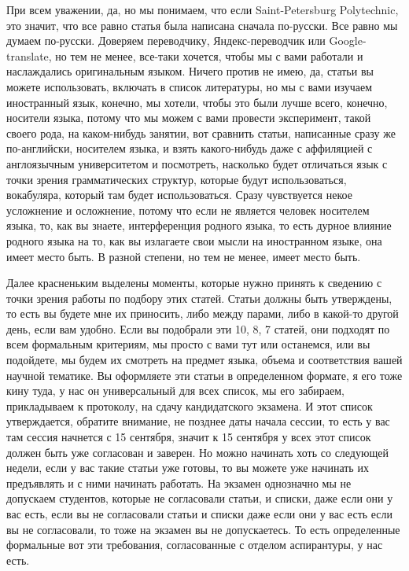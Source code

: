 \documentclass[main.tex]{subfiles}
\begin{document}
При всем уважении, да, но мы понимаем, что если Saint-Petersburg Polytechnic, это значит, что все равно статья была написана сначала по-русски.
Все равно мы думаем по-русски.
Доверяем переводчику, Яндекс-переводчик или Google-translate, но тем не менее, все-таки хочется, чтобы мы с вами работали и наслаждались оригинальным языком.
Ничего против не имею, да, статьи вы можете использовать, включать в список литературы, но мы с вами изучаем иностранный язык, конечно, мы хотели, чтобы это были лучше всего, конечно, носители языка, потому что мы можем с вами провести эксперимент, такой своего рода, на каком-нибудь занятии, вот сравнить статьи, написанные сразу же по-английски, носителем языка, и взять какого-нибудь даже с аффиляцией с англоязычным университетом и посмотреть, насколько будет отличаться язык с точки зрения грамматических структур, которые будут использоваться, вокабуляра, который там будет использоваться.
Сразу чувствуется некое усложнение и осложнение, потому что если не является человек носителем языка, то, как вы знаете, интерференция родного языка, то есть дурное влияние родного языка на то, как вы излагаете свои мысли на иностранном языке, она имеет место быть.
В разной степени, но тем не менее, имеет место быть.

Далее красненьким выделены моменты, которые нужно принять к сведению с точки зрения работы по подбору этих статей.
Статьи должны быть утверждены, то есть вы будете мне их приносить, либо между парами, либо в какой-то другой день, если вам удобно.
Если вы подобрали эти 10, 8, 7 статей, они подходят по всем формальным критериям, мы просто с вами тут или останемся, или вы подойдете, мы будем их смотреть на предмет языка, объема и соответствия вашей научной тематике.
Вы оформляете эти статьи в определенном формате, я его тоже кину туда, у нас он универсальный для всех список, мы его забираем, прикладываем к протоколу, на сдачу кандидатского экзамена.
И этот список утверждается, обратите внимание, не позднее даты начала сессии, то есть у вас там сессия начнется с 15 сентября, значит к 15 сентября у всех этот список должен быть уже согласован и заверен.
Но можно начинать хоть со следующей недели, если у вас такие статьи уже готовы, то вы можете уже начинать их предъявлять и с ними начинать работать.
На экзамен однозначно мы не допускаем студентов, которые не согласовали статьи, и списки, даже если они у вас есть, если вы не согласовали статьи и списки даже если они у вас есть если вы не согласовали, то тоже на экзамен вы не допускаетесь.
То есть определенные формальные вот эти требования, согласованные с отделом аспирантуры, у нас есть.
\end{document}

